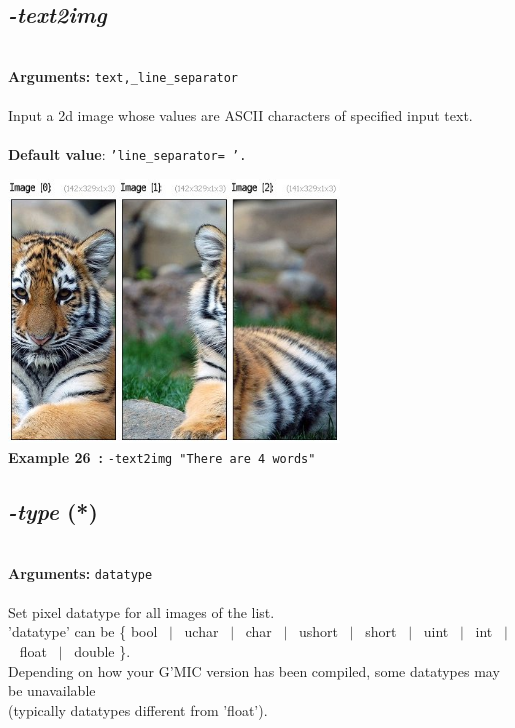 \documentclass[a4paper,11pt,twoside]{book}
\begin{document}
\subsection{\emph{-text2img} }\vspace*{-0.5em}
~\\\textbf{Arguments: } 
{\small \texttt{text,\_line\_separator}}\\~\\
Input a 2d image whose values are ASCII characters of specified input text.
~\\~\\\textbf{Default value}: {\small \texttt{'line\_separator= '.}}
\begin{center}\includegraphics[keepaspectratio=true,height=7cm,width=\textwidth]{img/gmic_def26.jpg}\\
{\footnotesize \textbf{Example 26~:} \texttt{-text2img "There are 4 words"}}
\end{center}

\subsection{\emph{-type} (*)}\vspace*{-0.5em}
~\\\textbf{Arguments: } 
{\small \texttt{datatype}}\\~\\
Set pixel datatype for all images of the list.
~\\'datatype' can be \{ bool ~$|$~ uchar ~$|$~ char ~$|$~ ushort ~$|$~ short ~$|$~ uint ~$|$~ int ~$|$~ float ~$|$~ double \}.
~\\Depending on how your G'MIC version has been compiled, some datatypes may be unavailable
~\\(typically datatypes different from 'float').
\end{document}
